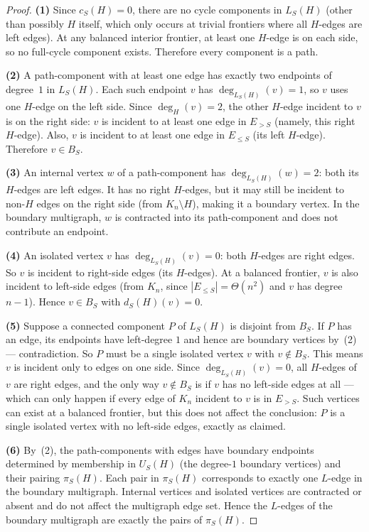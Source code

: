 \documentclass[11pt]{article}
\begin{document}
\begin{proof}
\textbf{(1)} Since $c_S(H) = 0$, there are no cycle
components in $L_S(H)$ (other than possibly $H$ itself,
which only occurs at trivial frontiers where all $H$-edges
are left edges).
At any balanced interior frontier, at least one $H$-edge
is on each side, so no full-cycle component exists.
Therefore every component is a path.

\textbf{(2)} A path-component with at least one edge has
exactly two endpoints of degree~$1$ in $L_S(H)$.
Each such endpoint $v$ has $\deg_{L_S(H)}(v) = 1$, so $v$
uses one $H$-edge on the left side.  Since
$\deg_H(v) = 2$, the other $H$-edge incident to $v$ is on
the right side: $v$ is incident to at least one edge in
$E_{> S}$ (namely, this right $H$-edge).
Also, $v$ is incident to at least one edge in $E_{\le S}$
(its left $H$-edge).  Therefore $v \in B_S$.

\textbf{(3)} An internal vertex $w$ of a path-component
has $\deg_{L_S(H)}(w) = 2$: both its $H$-edges are left
edges.  It has no right $H$-edges, but it may still be
incident to non-$H$ edges on the right side
(from $K_n \setminus H$), making it a boundary vertex.
In the boundary multigraph, $w$ is contracted into its
path-component and does not contribute an endpoint.

\textbf{(4)} An isolated vertex $v$ has
$\deg_{L_S(H)}(v) = 0$: both $H$-edges are right edges.
So $v$ is incident to right-side edges (its $H$-edges).
At a balanced frontier, $v$ is also incident to left-side
edges (from $K_n$, since $|E_{\le S}| = \Theta(n^2)$ and
$v$ has degree $n-1$).  Hence $v \in B_S$ with
$d_S(H)(v) = 0$.

\textbf{(5)} Suppose a connected component $P$ of
$L_S(H)$ is disjoint from $B_S$.
If $P$ has an edge, its endpoints have left-degree $1$
and hence are boundary vertices by~(2) --- contradiction.
So $P$ must be a single isolated vertex $v$ with
$v \notin B_S$.  This means $v$ is incident only to
edges on one side.  Since $\deg_{L_S(H)}(v) = 0$, all
$H$-edges of $v$ are right edges, and the only way
$v \notin B_S$ is if $v$ has no left-side edges at all
--- which can only happen if every edge of $K_n$ incident
to $v$ is in $E_{> S}$.  Such vertices can exist at a
balanced frontier, but this does not affect the
conclusion: $P$ is a single isolated vertex with no
left-side edges, exactly as claimed.

\textbf{(6)} By~(2), the path-components with edges have
boundary endpoints determined by membership in $U_S(H)$
(the degree-$1$ boundary vertices) and their pairing
$\pi_S(H)$.  Each pair in $\pi_S(H)$ corresponds to
exactly one $L$-edge in the boundary multigraph.
Internal vertices and isolated vertices are contracted
or absent and do not affect the multigraph edge set.
Hence the $L$-edges of the boundary multigraph are
exactly the pairs of $\pi_S(H)$.
\end{proof}
\end{document}
